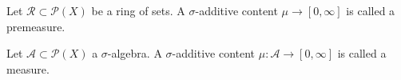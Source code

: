 %
\begin{definition}[Premeasure]
    Let \(\mathcal{R} \subset \mathcal{P}(X)\) be a ring of sets. A \(\sigma\)-additive content \(\mu \rightarrow [0, \infty]\) is called a premeasure.
\end{definition}
%
\begin{definition}[Measure]
    Let \(\mathcal{A} \subset \mathcal{P}(X)\) a \(\sigma\)-algebra. A \(\sigma\)-additive content \(\mu: \mathcal{A} \rightarrow [0, \infty]\) is called a measure.
\end{definition}